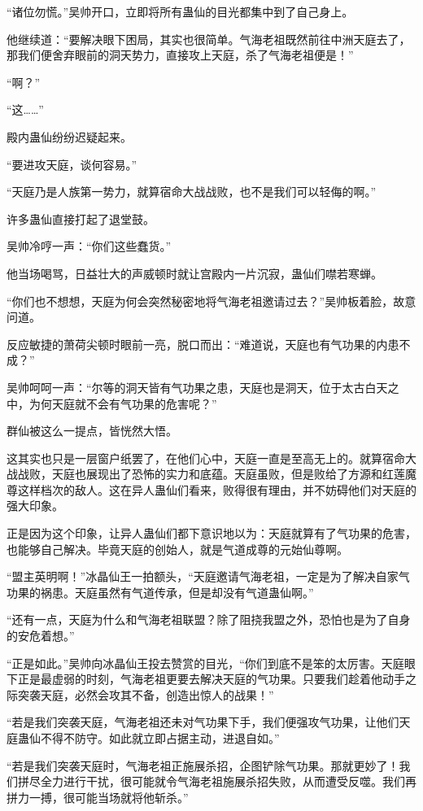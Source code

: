 \begin{this_body}
“诸位勿慌。”吴帅开口，立即将所有蛊仙的目光都集中到了自己身上。

他继续道：“要解决眼下困局，其实也很简单。气海老祖既然前往中洲天庭去了，那我们便舍弃眼前的洞天势力，直接攻上天庭，杀了气海老祖便是！”

“啊？”

“这……”

殿内蛊仙纷纷迟疑起来。

“要进攻天庭，谈何容易。”

“天庭乃是人族第一势力，就算宿命大战战败，也不是我们可以轻侮的啊。”

许多蛊仙直接打起了退堂鼓。

吴帅冷哼一声：“你们这些蠢货。”

他当场喝骂，日益壮大的声威顿时就让宫殿内一片沉寂，蛊仙们噤若寒蝉。

“你们也不想想，天庭为何会突然秘密地将气海老祖邀请过去？”吴帅板着脸，故意问道。

反应敏捷的萧荷尖顿时眼前一亮，脱口而出：“难道说，天庭也有气功果的内患不成？”

吴帅呵呵一声：“尔等的洞天皆有气功果之患，天庭也是洞天，位于太古白天之中，为何天庭就不会有气功果的危害呢？”

群仙被这么一提点，皆恍然大悟。

这其实也只是一层窗户纸罢了，在他们心中，天庭一直是至高无上的。就算宿命大战战败，天庭也展现出了恐怖的实力和底蕴。天庭虽败，但是败给了方源和红莲魔尊这样档次的敌人。这在异人蛊仙们看来，败得很有理由，并不妨碍他们对天庭的强大印象。

正是因为这个印象，让异人蛊仙们都下意识地以为：天庭就算有了气功果的危害，也能够自己解决。毕竟天庭的创始人，就是气道成尊的元始仙尊啊。

“盟主英明啊！”冰晶仙王一拍额头，“天庭邀请气海老祖，一定是为了解决自家气功果的祸患。天庭虽然有气道传承，但是却没有气道蛊仙啊。”

“还有一点，天庭为什么和气海老祖联盟？除了阻挠我盟之外，恐怕也是为了自身的安危着想。”

“正是如此。”吴帅向冰晶仙王投去赞赏的目光，“你们到底不是笨的太厉害。天庭眼下正是最虚弱的时刻，气海老祖更要去解决天庭的气功果。只要我们趁着他动手之际突袭天庭，必然会攻其不备，创造出惊人的战果！”

“若是我们突袭天庭，气海老祖还未对气功果下手，我们便强攻气功果，让他们天庭蛊仙不得不防守。如此就立即占据主动，进退自如。”

“若是我们突袭天庭时，气海老祖正施展杀招，企图铲除气功果。那就更妙了！我们拼尽全力进行干扰，很可能就令气海老祖施展杀招失败，从而遭受反噬。我们再拼力一搏，很可能当场就将他斩杀。”


\end{this_body}
